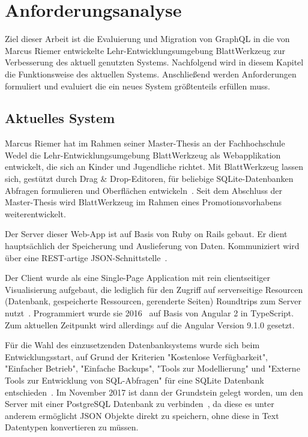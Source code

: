 
\chapter{Anforderungsanalyse}
\label{sec:requirements}

Ziel dieser Arbeit ist die Evaluierung und Migration von GraphQL in die von Marcus Riemer entwickelte Lehr-Entwicklungsumgebung BlattWerkzeug zur Verbesserung des aktuell genutzten Systems.
Nachfolgend wird in diesem Kapitel die Funktionsweise des aktuellen Systems. 
Anschließend werden Anforderungen formuliert und evaluiert die ein neues System größtenteils erfüllen muss.

\section{Aktuelles System}
\label{sec:requirements:system}

Marcus Riemer hat im Rahmen seiner Master-Thesis an der Fachhochschule Wedel die Lehr-Entwicklungsumgebung BlattWerkzeug als Webapplikation entwickelt,
die sich an Kinder und Jugendliche richtet. Mit BlattWerkzeug lassen sich, gestützt durch Drag \& Drop-Edi\-toren,
für beliebige SQLite-Datenbanken Abfragen formulieren und Oberflächen entwickeln~\cite[2]{riemer2016}.
Seit dem Abschluss der Master-Thesis wird BlattWerkzeug im Rahmen eines Promotionsvorhabens weiterentwickelt.

Der Server dieser Web-App ist auf Basis von Ruby on Rails gebaut. Er dient hauptsächlich der Speicherung und Auslieferung von Daten.
Kommuniziert wird über eine REST-artige JSON-Schnittstelle~\cite[94]{riemer2016}.

Der Client wurde als eine Single-Page Application mit rein clientseitiger Visualisierung aufgebaut,
die lediglich für den Zugriff auf serverseitige Resourcen  (Datenbank, gespeicherte Ressourcen, gerenderte Seiten) Roundtrips zum Server nutzt~\cite[94-95]{riemer2016}.
Programmiert wurde sie 2016~\cite[1]{riemer2016} auf Basis von Angular 2 in TypeScript.
Zum aktuellen Zeitpunkt wird allerdings auf die Angular Version 9.1.0 gesetzt.

Für die Wahl des einzusetzenden Datenbanksystems wurde sich beim Entwicklungsstart, auf Grund der Kriterien "Kostenlose Verfügbarkeit",
"Einfacher Betrieb", "Einfache Backups", "Tools zur Modellierung" und "Externe Tools zur Entwicklung von SQL-Abfragen"
für eine SQLite Datenbank entschieden~\cite[99-100]{riemer2016}. Im November 2017 ist dann der Grundstein gelegt worden,
um den Server mit einer PostgreSQL Datenbank zu verbinden~\cite{riemerPostgresCommit}, da diese es unter anderem ermöglicht JSON Objekte direkt zu speichern,
ohne diese in Text Datentypen konvertieren zu müssen.

